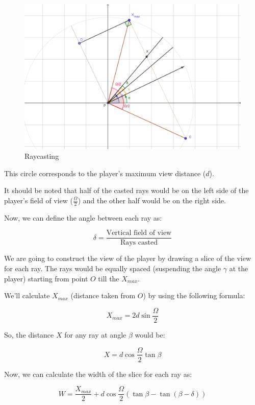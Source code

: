 \begin{figure}[!ht]
    \centering
    \includegraphics[width=\textwidth]{./images/raycasting.png}
    \caption{Raycasting}
    \label{fig:rays}
\end{figure}

This circle corresponds to the player's maximum view distance ($d$).

It should be noted that half of the casted rays would be on the left side of the player's field of view ($\frac{\Omega}{2}$) and the other half would be on the right side. 

Now, we can define the angle between each ray as:

\begin{equation}
	\delta = \frac{\text{Vertical field of view}}{\text{Rays casted}}
\end{equation}

We are going to construct the view of the player by drawing a slice of the view for each ray. The rays would be equally spaced (suspending the angle $\gamma$ at the player) starting from point $O$ till the $X_{max}$.

We'll calculate $X_{max}$ (distance taken from $O$) by using the following formula:

\begin{equation}
	X_{max} = 2 d \sin\frac{\Omega}{2}
\end{equation}

So, the distance $X$ for any ray at angle $\beta$ would be:

\begin{equation}
	X = d \cos\frac{\Omega}{2} \tan\beta
\end{equation}

Now, we can calculate the width of the slice for each ray as:

\begin{equation}
	W = \frac{X_{max}}{2} + d \cos\frac{\Omega}{2} (\tan\beta - \tan(\beta - \delta))
\end{equation}

\newpage

